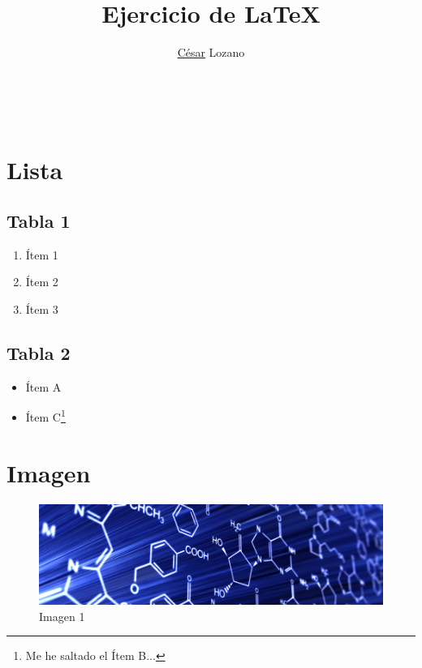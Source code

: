 \documentclass[10pt,a4paper]{book}
\author{\underline {César} Lozano}
\title{Ejercicio de \LaTeX}
\begin{document}
\begin{titlepage}
\begin{Huge}
\maketitle
\end{Huge}
\end{titlepage}
\thispagestyle{empty}
$\ $


\tableofcontents
{}
\chapter{Lista}
\section{Tabla 1}
\begin{enumerate}
\item Ítem 1
\item Ítem 2
\item Ítem 3
\end{enumerate}
\section{Tabla 2}
\begin{flushright}
\begin{itemize}
\item Ítem A
\item Ítem C\footnote{Me he saltado el Ítem B...}
\end{itemize}
\end{flushright}


\cleardoublepage


\chapter{Imagen}
\begin{figure}[hbt]
\begin{center}
\includegraphics[scale=0.3]{./portada.jpg}
\caption{Imagen 1}
\end{center}
\end{figure}
\end{document}
